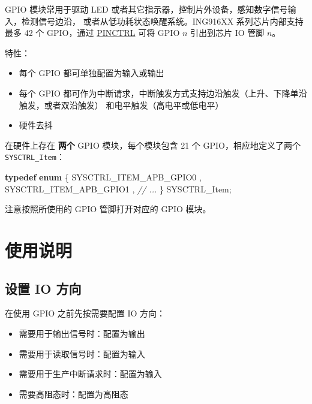 \documentclass[
  12pt,
]{book}
\makeatletter
\newenvironment{Shaded}{\begin{snugshade}}{\end{snugshade}}
\newcommand{\CommentTok}[1]{\textcolor[rgb]{0.56,0.35,0.01}{\textit{#1}}}
\newcommand{\KeywordTok}[1]{\textcolor[rgb]{0.13,0.29,0.53}{\textbf{#1}}}
\newcommand{\NormalTok}[1]{#1}
\providecommand{\tightlist}{%
  \setlength{\itemsep}{0pt}\setlength{\parskip}{0pt}}
\newenvironment{kframe}{%
\medskip{}
\setlength{\fboxsep}{.8em}
 \def\at@end@of@kframe{}%
 \ifinner\ifhmode%
  \def\at@end@of@kframe{\end{minipage}}%
  \begin{minipage}{\columnwidth}%
 \fi\fi%
 \def\FrameCommand##1{\hskip\@totalleftmargin \hskip-\fboxsep
 \colorbox{shadecolor}{##1}\hskip-\fboxsep
     \hskip-\linewidth \hskip-\@totalleftmargin \hskip\columnwidth}%
 \MakeFramed {\advance\hsize-\width
   \@totalleftmargin\z@ \linewidth\hsize
   \@setminipage}}%
 {\par\unskip\endMakeFramed%
 \at@end@of@kframe}
\newenvironment{rmdblock}[1]
  {
  \begin{itemize}
  \renewcommand{\labelitemi}{
    \raisebox{-.7\height}[0pt][0pt]{
      {\setkeys{Gin}{width=3em,keepaspectratio}\texttt{[image: images/\#1]}}
    }
  }
  \setlength{\fboxsep}{1em}
  \begin{kframe}
  \item
  }
  {
  \end{kframe}
  \end{itemize}
  }
\newenvironment{rmdcaution}
  {\begin{rmdblock}{caution}}
  {\end{rmdblock}}
\makeatother
\begin{document}
GPIO 模块常用于驱动 LED 或者其它指示器，控制片外设备，感知数字信号输入，检测信号边沿，
或者从低功耗状态唤醒系统。ING916XX 系列芯片内部支持最多 42 个 GPIO，通过 \protect\hyperlink{ch-pinctrl}{PINCTRL}
可将 GPIO \(n\) 引出到芯片 IO 管脚 \(n\)。

特性：

\begin{itemize}
\tightlist
\item
  每个 GPIO 都可单独配置为输入或输出
\item
  每个 GPIO 都可作为中断请求，中断触发方式支持边沿触发（上升、下降单沿触发，或者双沿触发）
  和电平触发（高电平或低电平）
\item
  硬件去抖
\end{itemize}

在硬件上存在 \textbf{两个} GPIO 模块，每个模块包含 21 个 GPIO，相应地定义了两个 \texttt{SYSCTRL\_Item}：

\begin{Shaded}
\begin{Highlighting}[]
\KeywordTok{typedef} \KeywordTok{enum}
\NormalTok{\{}
\NormalTok{    SYSCTRL_ITEM_APB_GPIO0     ,}
\NormalTok{    SYSCTRL_ITEM_APB_GPIO1     ,}
    \CommentTok{// ...}
\NormalTok{\} SYSCTRL_Item;}
\end{Highlighting}
\end{Shaded}

\begin{rmdcaution}
注意按照所使用的 GPIO 管脚打开对应的 GPIO 模块。
\end{rmdcaution}

\hypertarget{ux4f7fux7528ux8bf4ux660e-1}{%
\section{使用说明}\label{ux4f7fux7528ux8bf4ux660e-1}}

\hypertarget{ux8bbeux7f6e-io-ux65b9ux5411}{%
\subsection{设置 IO 方向}\label{ux8bbeux7f6e-io-ux65b9ux5411}}

在使用 GPIO 之前先按需要配置 IO 方向：

\begin{itemize}
\tightlist
\item
  需要用于输出信号时：配置为输出
\item
  需要用于读取信号时：配置为输入
\item
  需要用于生产中断请求时：配置为输入
\item
  需要高阻态时：配置为高阻态
\end{itemize}
\end{document}
